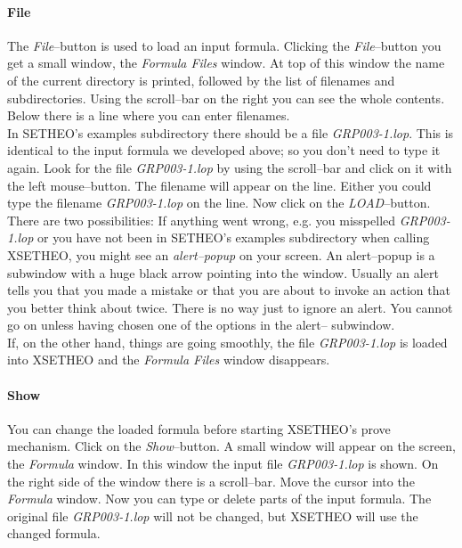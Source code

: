 \paragraph{File}
The {\it File\/}--button is used to load an input formula. Clicking
the {\it File\/}--button you get a small window, the {\it Formula
Files\/} window. At top of this window the name of the current directory
is printed, followed by the list of filenames and
subdirectories. Using the scroll--bar on the right you can see the
whole contents. Below there is a line where you can enter
filenames.\\ 
In SETHEO's examples subdirectory there should be a file
{\it GRP003-1.lop\/}. This is identical to the input formula we
developed above; so you don't need to type it again.
Look for the file {\it GRP003-1.lop\/} by using the scroll--bar and
click on it with the left mouse--button. The filename will appear on
the line. Either you could type the filename {\it GRP003-1.lop\/} on
the line. Now click on the {\it LOAD\/}--button. There are two
possibilities: If anything went wrong, e.g. you misspelled {\it
GRP003-1.lop\/} or you have not been in SETHEO's examples subdirectory
when calling XSETHEO, you might see an {\it alert--popup\/} on your
screen. An alert--popup is a subwindow with a huge black arrow
pointing into the window. Usually an alert tells you that you made a
mistake or that you are about to invoke an action that you better
think about twice. There is no way just to ignore an alert. You cannot
go on unless having chosen one of the options in the alert--
subwindow. \\  
If, on the other hand, things are going smoothly, the file {\it
GRP003-1.lop\/} is loaded into XSETHEO and the {\it Formula Files\/}
window disappears.

\paragraph{Show}
You can change the loaded formula before starting XSETHEO's
prove mechanism. Click on the {\it Show\/}--button. A small window
will appear on the screen, the {\it Formula\/} window. In this
window the input file {\it GRP003-1.lop\/} is shown. On the right side of the
window there is a scroll--bar. Move the cursor into the {\it Formula\/}
window. Now you can type or delete parts of the input formula. The
original file {\it GRP003-1.lop\/} will not be changed, but XSETHEO will
use the changed formula. 

